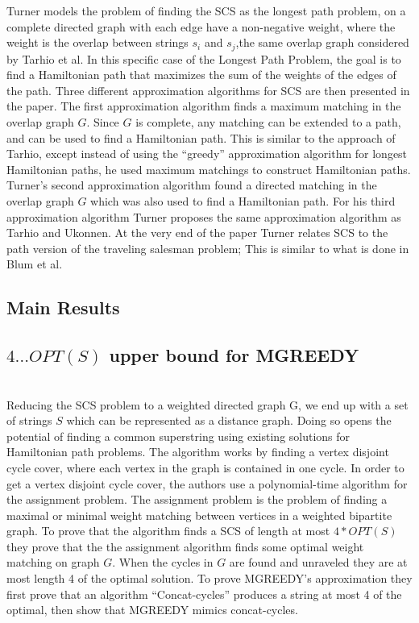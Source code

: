 \documentclass[letterpaper,11pt,titlepage]{article}
\begin{document}
Turner models the problem of finding the SCS as the longest path problem, on a complete directed graph with each edge have a non-negative weight, where the weight is the overlap between strings $s_i$ and $s_j$,the same overlap graph considered by Tarhio et al.  In this specific case of the Longest Path Problem, the goal is to find a Hamiltonian path that maximizes the sum of the weights of the edges of the path. 
Three different approximation algorithms for SCS are then presented in the paper. The first approximation algorithm finds a maximum matching in the overlap graph $G$.  Since $G$ is complete, any matching can be extended to a path, and can be used to find a Hamiltonian path.  This is similar to the approach of Tarhio, except instead of using the ``greedy'' approximation algorithm for longest Hamiltonian paths, he used maximum matchings to construct Hamiltonian paths.  Turner's second approximation algorithm found a directed matching in the overlap graph $G$ which was also used to find a Hamiltonian path.  For his third approximation algorithm Turner proposes the same approximation algorithm as Tarhio and Ukonnen. At the very end of the paper Turner relates SCS to the path version of the traveling salesman problem; This is similar to what is done in Blum et al. 


\subsection*{Main Results}

\subsection*{$4 \ldots OPT(S)$ upper bound for MGREEDY}\\

Reducing the SCS problem to a weighted directed  graph G, we end up with a set of strings $S$ which can be represented as a distance graph. Doing so opens the potential of finding a common superstring using existing solutions for Hamiltonian path problems. The algorithm works by finding a vertex disjoint cycle cover, where each vertex in the graph is contained in one cycle. In order to get a vertex disjoint cycle cover, the authors use a polynomial-time algorithm for the assignment problem. The assignment problem is the problem of finding a maximal or minimal weight matching between vertices in a weighted bipartite graph. To prove that the algorithm finds a SCS of length at most $4 * OPT(S)$ they prove that the the assignment algorithm finds some optimal weight matching on graph $G$. When the cycles in $G$ are found and unraveled they are at most length 4 of the optimal solution. To prove MGREEDY's approximation they first prove that an algorithm ``Concat-cycles'' produces a string at most 4 of the optimal, then show that MGREEDY mimics concat-cycles.
\end{document}
